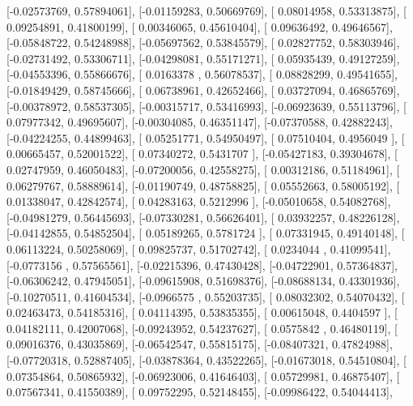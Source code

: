 \documentclass{article}
\begin{document}
       [-0.02573769,  0.57894061],
       [-0.01159283,  0.50669769],
       [ 0.08014958,  0.53313875],
       [ 0.09254891,  0.41800199],
       [ 0.00346065,  0.45610404],
       [ 0.09636492,  0.49646567],
       [-0.05848722,  0.54248988],
       [-0.05697562,  0.53845579],
       [ 0.02827752,  0.58303946],
       [-0.02731492,  0.53306711],
       [-0.04298081,  0.55171271],
       [ 0.05935439,  0.49127259],
       [-0.04553396,  0.55866676],
       [ 0.0163378 ,  0.56078537],
       [ 0.08828299,  0.49541655],
       [-0.01849429,  0.58745666],
       [ 0.06738961,  0.42652466],
       [ 0.03727094,  0.46865769],
       [-0.00378972,  0.58537305],
       [-0.00315717,  0.53416993],
       [-0.06923639,  0.55113796],
       [ 0.07977342,  0.49695607],
       [-0.00304085,  0.46351147],
       [-0.07370588,  0.42882243],
       [-0.04224255,  0.44899463],
       [ 0.05251771,  0.54950497],
       [ 0.07510404,  0.4956049 ],
       [ 0.00665457,  0.52001522],
       [ 0.07340272,  0.5431707 ],
       [-0.05427183,  0.39304678],
       [ 0.02747959,  0.46050483],
       [-0.07200056,  0.42558275],
       [ 0.00312186,  0.51184961],
       [ 0.06279767,  0.58889614],
       [-0.01190749,  0.48758825],
       [ 0.05552663,  0.58005192],
       [ 0.01338047,  0.42842574],
       [ 0.04283163,  0.5212996 ],
       [-0.05010658,  0.54082768],
       [-0.04981279,  0.56445693],
       [-0.07330281,  0.56626401],
       [ 0.03932257,  0.48226128],
       [-0.04142855,  0.54852504],
       [ 0.05189265,  0.5781724 ],
       [ 0.07331945,  0.49140148],
       [ 0.06113224,  0.50258069],
       [ 0.09825737,  0.51702742],
       [ 0.0234044 ,  0.41099541],
       [-0.0773156 ,  0.57565561],
       [-0.02215396,  0.47430428],
       [-0.04722901,  0.57364837],
       [-0.06306242,  0.47945051],
       [-0.09615908,  0.51698376],
       [-0.08688134,  0.43301936],
       [-0.10270511,  0.41604534],
       [-0.0966575 ,  0.55203735],
       [ 0.08032302,  0.54070432],
       [ 0.02463473,  0.54185316],
       [ 0.04114395,  0.53835355],
       [ 0.00615048,  0.4404597 ],
       [ 0.04182111,  0.42007068],
       [-0.09243952,  0.54237627],
       [ 0.0575842 ,  0.46480119],
       [ 0.09016376,  0.43035869],
       [-0.06542547,  0.55815175],
       [-0.08407321,  0.47824988],
       [-0.07720318,  0.52887405],
       [-0.03878364,  0.43522265],
       [-0.01673018,  0.54510804],
       [ 0.07354864,  0.50865932],
       [-0.06923006,  0.41646403],
       [ 0.05729981,  0.46875407],
       [ 0.07567341,  0.41550389],
       [ 0.09752295,  0.52148455],
       [-0.09986422,  0.54044413],
\end{document}
